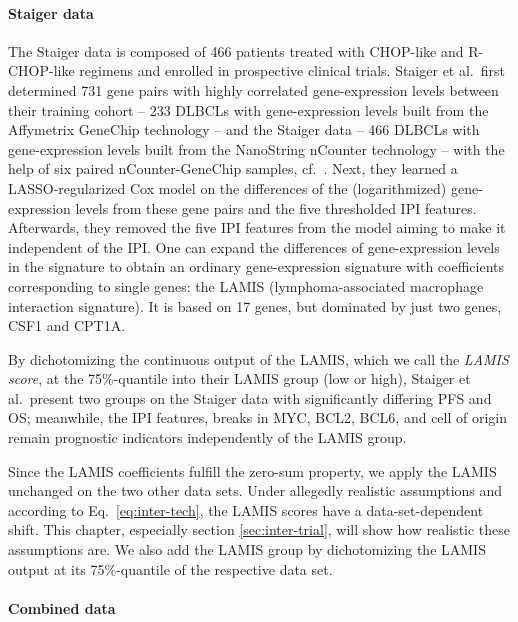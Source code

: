 \paragraph{Staiger data}

The Staiger data is composed of \num{466} patients treated with CHOP-like and R-CHOP-like regimens 
and enrolled in prospective clinical trials. 
Staiger et al.\ first determined \num{731} gene pairs with highly correlated gene-expression levels 
between their training cohort -- \num{233} DLBCLs with gene-expression levels built from the Affymetrix 
GeneChip technology -- and the Staiger data -- \num{466} DLBCLs with gene-expression levels built 
from the NanoString nCounter technology -- with the help of six paired nCounter-GeneChip samples, cf.\ 
\cite[Supplementary Methods]{staiger20}.
Next, they learned a LASSO-regularized Cox model on the differences of the (logarithmized) 
gene-expression levels from these gene pairs and the five thresholded IPI features.
Afterwards, they removed the five IPI features from the model aiming to make it independent of the 
IPI. One can expand the differences of gene-expression levels in the signature to obtain an ordinary 
gene-expression signature with coefficients corresponding to single genes: the LAMIS 
(lymphoma-associated macrophage interaction signature). It is 
based on \num{17} genes, but dominated by just two genes, CSF1 and CPT1A. 

By dichotomizing the 
continuous output of the LAMIS, which we call the \textit{LAMIS score}, at the 75\%-quantile into 
their LAMIS group (low or high), Staiger et al.\ present two 
groups on the Staiger data with significantly differing PFS and OS; 
meanwhile, the IPI features, breaks in MYC, BCL2, BCL6, and cell of origin remain prognostic 
indicators independently of the LAMIS group.

Since the LAMIS coefficients fulfill the 
zero-sum property, we apply the LAMIS unchanged on the two other data sets. Under allegedly realistic 
assumptions and according to Eq.\ \eqref{eq:inter-tech}, the LAMIS scores have a data-set-dependent 
shift. This chapter, especially section \ref{sec:inter-trial}, will show how realistic these 
assumptions are. 
We also add the LAMIS group by dichotomizing the LAMIS output at its 75\%-quantile of the respective 
data set.

\paragraph{Combined data}

